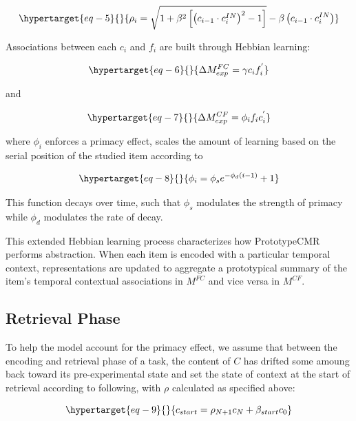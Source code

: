 \documentclass[
  letterpaper,
  DIV=11]{article}
\begin{document}
\begin{equation}\protect\hypertarget{eq-5}{}{ 
\rho_i = \sqrt{1 + \beta^2\left[\left(c_{i-1} \cdot c^{IN}_i\right)^2 - 1\right]} - \beta\left(c_{i-1} \cdot
c^{IN}_i\right)
}\label{eq-5}\end{equation}

Associations between each \(c_i\) and \(f_i\) are built through Hebbian
learning:

\begin{equation}\protect\hypertarget{eq-6}{}{
\Delta M^{FC}_{exp} = \gamma c_i f^{'}_i
}\label{eq-6}\end{equation}

and

\begin{equation}\protect\hypertarget{eq-7}{}{
\Delta M^{CF}_{exp} = \phi_i f_i c^{'}_i
}\label{eq-7}\end{equation}

where \(\phi_i\) enforces a primacy effect, scales the amount of
learning based on the serial position of the studied item according to

\begin{equation}\protect\hypertarget{eq-8}{}{ 
\phi_i = \phi_se^{-\phi_d(i-1)} + 1
}\label{eq-8}\end{equation}

This function decays over time, such that \(\phi_{s}\) modulates the
strength of primacy while \(\phi_{d}\) modulates the rate of decay.

This extended Hebbian learning process characterizes how PrototypeCMR
performs abstraction. When each item is encoded with a particular
temporal context, representations are updated to aggregate a
prototypical summary of the item's temporal contextual associations in
\(M^{FC}\) and vice versa in \(M^{CF}\).

\hypertarget{retrieval-phase}{%
\subsection{Retrieval Phase}\label{retrieval-phase}}

To help the model account for the primacy effect, we assume that between
the encoding and retrieval phase of a task, the content of \(C\) has
drifted some amoung back toward its pre-experimental state and set the
state of context at the start of retrieval according to following, with
\(\rho\) calculated as specified above:

\begin{equation}\protect\hypertarget{eq-9}{}{ 
c_{start} = \rho_{N+1}c_N + \beta_{start}c_0
}\label{eq-9}\end{equation}
\end{document}
